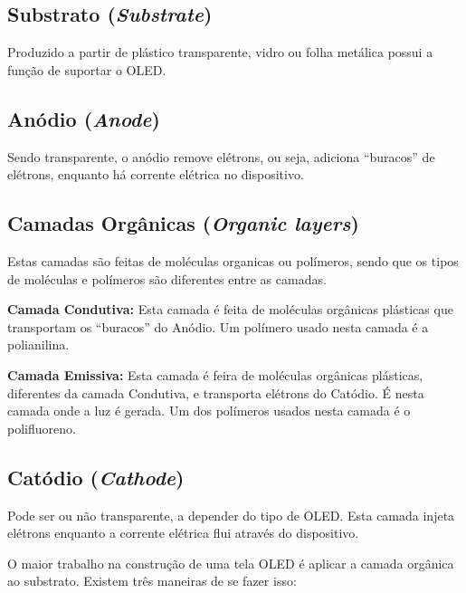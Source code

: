 \subsection{Substrato (\textit{Substrate})}
\label{sec:substrato}

Produzido a partir de plástico transparente, vidro ou folha metálica possui a função de suportar o OLED.


\subsection{Anódio (\textit{Anode})}
\label{sec:substrato}

Sendo transparente, o anódio remove elétrons, ou seja, adiciona  ``buracos''  de elétrons, enquanto há corrente elétrica no dispositivo.


\subsection{Camadas Orgânicas (\textit{Organic layers})}
\label{sec:substrato}

Estas camadas são feitas de moléculas organicas ou polímeros, sendo que os tipos de moléculas e polímeros são diferentes entre as camadas.

{\bf Camada Condutiva:} Esta camada é feita de moléculas orgânicas plásticas que transportam os ``buracos'' do Anódio. Um polímero usado nesta camada é a polianilina.

{\bf Camada Emissiva:} Esta camada é feira de moléculas orgânicas plásticas, diferentes da camada Condutiva, e transporta elétrons do Catódio. É nesta camada onde a luz é gerada. Um dos polímeros usados nesta camada é o polifluoreno. 


\subsection{Catódio (\textit{Cathode})}
\label{sec:substrato}

Pode ser ou não transparente, a depender do tipo de OLED. Esta camada injeta elétrons enquanto a corrente elétrica flui através do dispositivo. 

O maior trabalho na construção de uma tela OLED é aplicar a camada orgânica ao substrato. Existem três maneiras de se fazer isso:

